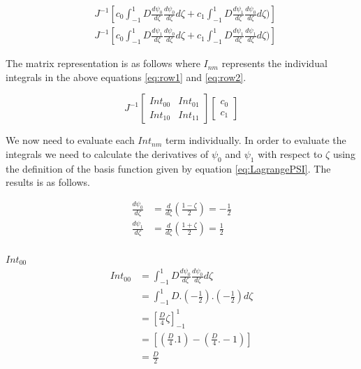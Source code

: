 \documentclass[11pt]{article}
\begin{document}
\begin{subequations}
\label{eq:matrixform}
\begin{align}
&J^{-1} \left  [c_0 \int_{-1}^{1} D \frac{d\psi_{0}}{d\zeta} \frac{d\psi_{0}}{d \zeta} d \zeta + c_1 \int_{-1}^{1} D \frac{d\psi_{1}}{d\zeta} \frac{d\psi_{0}}{d\zeta}d\zeta ) \right ] \label{eq:row1} \\
&J^{-1} \left  [ c_0 \int_{-1}^{1} D \frac{d\psi_{1}}{d\zeta} \frac{d\psi_{0}}{d \zeta} d \zeta + c_1 \int_{-1}^{1} D \frac{d\psi_{1}}{d\zeta} \frac{d\psi_{1}}{d\zeta}d\zeta ) \right ] \label{eq:row2} 
\end{align}
\end{subequations}

The matrix representation is as follows where $I_{nm}$ represents the individual integrals in the above equations \ref{eq:row1} and \ref{eq:row2}. 

\begin{equation}
J^{-1}
\begin{bmatrix}

Int_{00} & Int_{01} \\
Int_{10} & Int_{11}
\end{bmatrix}
\begin{bmatrix}

c_{0} \\  c_{1} 
\end{bmatrix}
\end{equation}

We now need to evaluate each $Int_{nm}$ term individually. In order to evaluate the integrals we need to calculate the derivatives of $\psi_0$ and $\psi_{1}$ with respect to $\zeta$ using the definition of the basis function given by equation \ref{eq:LagrangePSI}. The results is as follows.

\begin{subequations}
\label{eq:prematrix}
\begin{align}
\frac{d\psi_{0}}{d\zeta} &= \frac{d}{d\zeta}(\frac{1-\zeta}{2}) = -\frac{1}{2} \label{eq:psi0der}\\
\frac{d\psi_{1}}{d\zeta} &= \frac{d}{d\zeta}(\frac{1+\zeta}{2}) = \frac{1}{2} \label{eq:psi1der}
\end{align}
\end{subequations}
\\


\underline{$Int_{00}$} \\


\begin{equation}\label{eq:Int00}
\begin{split}
 Int_{00} &= \int_{-1}^{1} D \frac{d\psi_{0}}{d\zeta} \frac{d\psi_{0}}{d \zeta} d \zeta \\
&=  \int_{-1}^{1} D .( -\frac{1}{2}). (-\frac{1}{2}) d\zeta \\
& = \left[ \frac{D}{4} \zeta \right]_{-1}^{1} \\
& = \left[ (\frac{D}{4}.1) - (\frac{D}{4}.-1) \right] \\
& = \frac{D}{2}
\end{split}
\end{equation}
\end{document}
